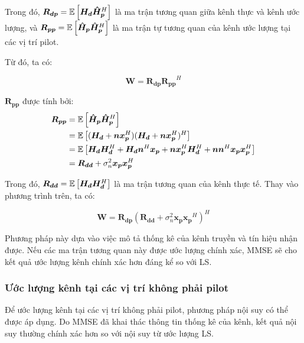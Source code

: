 Trong đó, \( \bm{R_{dp}} = \mathbb{E} \left[ \bm{H_d}\bm{\hat{H}_p}^H \right] \) là ma trận tương quan giữa kênh thực và kênh ước lượng, 
và \( \bm{R_{pp}} = \mathbb{E} \left[ \bm{\hat{H}_p}\bm{\hat{H}_p}^H \right] \) là ma trận tự tương quan của kênh ước lượng tại các vị trí pilot.

Từ đó, ta có:

\[
    \bm{W} = \bm{R_{dp}} \bm{R_{pp}}^{H}
\]

\( \bm{R_{pp}} \) được tính bởi:
% 
\begin{align*}
    \bm{R_{pp}} 
    &= \mathbb{E} \left[ \bm{\hat{H}_p}\bm{\hat{H}_p}^H \right] \\
    &= \mathbb{E} \left[ (\bm{H_d} + \bm{n}\bm{x_p}^H)(\bm{H_d} + \bm{n}\bm{x_p}^H)^H \right] \\
    &= \mathbb{E} \left[ \bm{H_d}\bm{H_d}^H + \bm{H_d}\bm{n}^H\bm{x_p} + \bm{n}\bm{x_p}^H\bm{H_d}^H + \bm{n}\bm{n}^H\bm{x_p}\bm{x_p}^H \right] \\
    &= \bm{R_{dd}} + \sigma_n^2\bm{x_p}\bm{x_p}^H
\end{align*}

Trong đó, \( \bm{R_{dd}} = \mathbb{E} \left[ \bm{H_d}\bm{H_d}^H \right] \) là ma trận tương quan của kênh thực tế. Thay vào phương trình trên, ta có:

\begin{equation}
    \bm{W} = \bm{R_{dp}} (\bm{R_{dd}} + \sigma_n^2\bm{x_p}\bm{x_p}^H)^{H}
\end{equation}

Phương pháp này dựa vào việc mô tả thống kê của kênh truyền và tín hiệu nhận được. 
Nếu các ma trận tương quan này được ước lượng chính xác, MMSE sẽ cho kết quả ước lượng kênh chính xác hơn đáng kể so với LS.

\subsubsection{Ước lượng kênh tại các vị trí không phải pilot}

Để ước lượng kênh tại các vị trí không phải pilot, phương pháp nội suy có thể được áp dụng. 
Do MMSE đã khai thác thông tin thống kê của kênh, kết quả nội suy thường chính xác hơn so với nội suy từ ước lượng LS.

